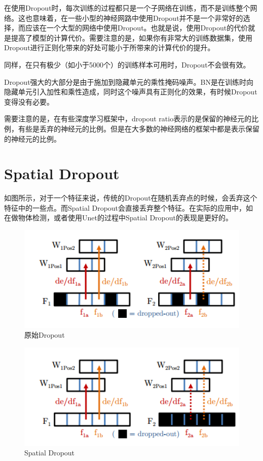 	在使用Dropout时，每次训练的过程都只是一个子网络在训练，而不是训练整个网络。这也意味着，在一些小型的神经网路中使用Dropout并不是一个非常好的选择，而应该在一个大型的网络中使用Dropout。也就是说，使用Dropout的代价就是提高了模型的计算代价。需要注意的是，如果你有非常大的训练数据集，使用Dropout进行正则化带来的好处可能小于所带来的计算代价的提升。
	
	同样，在只有极少（如小于5000个）的训练样本可用时，Dropout不会很有效。
	
	Dropout强大的大部分是由于施加到隐藏单元的乘性掩码噪声。BN是在训练时向隐藏单元引入加性和乘性造成，同时这个噪声具有正则化的效果，有时候Dropout变得没有必要。
	
	需要注意的是，在有些深度学习框架中，dropout ratio表示的是保留的神经元的比例，有些是丢弃的神经元的比例。但是在大多数的神经网络的框架中都是表示保留的神经元的比例。
	
\section{Spatial Dropout}
	
	如图所示，对于一个特征来说，传统的Dropout在随机丢弃点的时候，会丢弃这个特征中的一些点。而Spatial Dropout会直接丢弃整个特征。在实际的应用中，如在做物体检测，或者使用Unet的过程中Spatial Dropout的表现是更好的。
	\begin{figure}[!htbp]
	\centering\includegraphics[width=6in]{img/3-3.png}
	\caption{原始Dropout}\label{fig:3-3}
	\end{figure}
	\newpage
	
	\begin{figure}[!htbp]
	\centering\includegraphics[width=6in]{img/3-4.png}
	\caption{Spatial Dropout}\label{fig:3-4}
	\end{figure}

